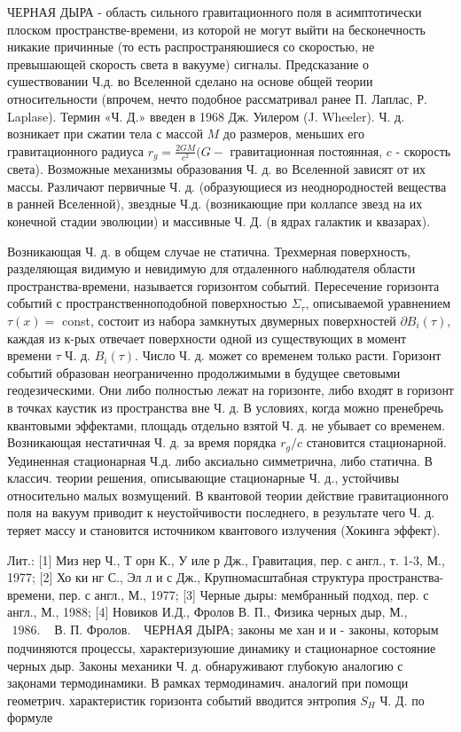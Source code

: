 \documentclass[10pt]{article}
\begin{document}
ЧЕРНАЯ ДЫРА - область сильного гравитационного поля в асимптотически плоском пространстве-времени, из которой не могут выйти на бесконечность никакие причинные (то есть распространяюшиеся со скоростью, не превышающей скорость света в вакууме) сигналы. Предсказание о сушествовании Ч.д. во Вселенной сделано на основе общей теории относительности (впрочем, нечто подобное рассматривал ранее П. Лаплас, Р. Laplase). Термин «Ч. Д.» введен в 1968 Дж. Уилером (J. Wheeler). Ч. д. возникает при сжатии тела с массой $M$ до размеров, меньших его гравитационного радиуса $r_{g}=\frac{2 G M}{c^{2}}(G-$ гравитационная постоянная, $c$ - скорость света). Возможные механизмы образования Ч. д. во Вселенной зависят от их массы. Различают первичные Ч. д. (образующиеся из неоднородностей вещества в ранней Вселенной), звездные Ч.д. (возникающие при коллапсе звезд на их конечной стадии эволюции) и массивные Ч. Д. (в ядрах галактик и квазарах).



Возникающая Ч. д. в общем случае не статична. Трехмерная поверхность, разделяющая видимую и невидимую для отдаленного наблюдателя области пространства-времени, называется горизонтом событий. Пересечение горизонта событий с пространственноподобной поверхностью $\Sigma_{\tau}$, описываемой уравнением $\tau(x)=$ const, состоит из набора замкнутых двумерных поверхностей $\partial B_{i}(\tau)$, каждая из к-рых отвечает поверхности одной из существующих в момент времени $\tau$ Ч. д. $B_{i}(\tau)$. Число Ч. д. может со временем только расти. Горизонт событий образован неограниченно продолжимыми в будущее световыми геодезическими. Они либо полностью лежат на горизонте, либо входят в горизонт в точках каустик из пространства вне Ч. д. В условиях, когда можно пренебречь квантовыми эффектами, площадь отдельно взятой Ч. д. не убывает со временем. Возникающая нестатичная Ч. д. за время порядка $r_{g} / c$ становится стационарной. Уединенная стационарная Ч.д. либо аксиально симметрична, либо статична. В классич. теории решения, описывающие стационарные Ч. д., устойчивы относительно малых возмущений. В квантовой теории действие гравитационного поля на вакуум приводит к неустойчивости последнего, в результате чего Ч. д. теряет массу и становится источником квантового излучения (Хокинга эффект).



Лит.: [1] Миз нер Ч., Т орн К., У иле р Дж., Гравитация, пер. с англ., т. 1-3, М., 1977; [2] Хо ки нг С., Эл л и с Дж., Крупномасштабная структура пространства-времени, пер. с англ., М., 1977; [3] Черные дыры: мембранный подход, пер. с англ., М., 1988; [4] Новиков И.Д., Фролов В. П., Физика черных дыр, М., $\begin{array}{ll}1986 . & \text { В. П. Фролов. }\end{array}$ ЧЕРНАЯ ДЫРА; законы ме хан и и - законы, которым подчиняются процессы, характеризуюшие динамику и стационарное состояние черных дыр. Законы механики Ч. д. обнаруживают глубокую аналогию с зақонами термодинамики. В рамках термодинамич. аналогий при помощи геометрич. характеристик горизонта событий вводится энтропия $S_{H}$ Ч. Д. по формуле
\end{document}
